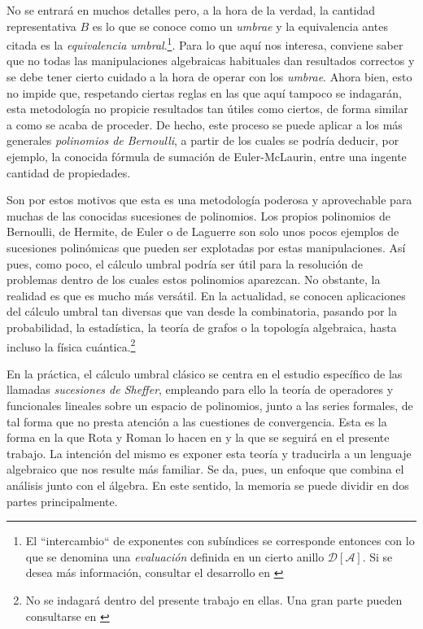 No se entrará en muchos detalles pero, a la hora de la verdad, la cantidad representativa $B$ es lo que se conoce como un \textit{umbrae} y la equivalencia antes citada es la \textit{equivalencia umbral}.\footnote{El ``intercambio`` de exponentes con subíndices se corresponde entonces con lo que se denomina una \textit{evaluación} definida en un cierto anillo $\mathcal{D}[\mathcal{A}]$. Si se desea más información, consultar el desarrollo en \cite{rota}}. Para lo que aquí nos interesa, conviene saber que no todas las manipulaciones algebraicas habituales dan resultados correctos y se debe tener cierto cuidado a la hora de operar con los \textit{umbrae}. Ahora bien, esto no impide que, respetando ciertas reglas en las que aquí tampoco se indagarán, esta metodología no propicie resultados tan útiles como ciertos, de forma similar a como se acaba de proceder. De hecho, este proceso se puede aplicar a los más generales \textit{polinomios de Bernoulli}, a partir de los cuales se podría deducir, por ejemplo, la conocida fórmula de sumación de Euler-McLaurin, entre una ingente cantidad de propiedades.

Son por estos motivos que esta es una metodología poderosa y aprovechable para muchas de las conocidas sucesiones de polinomios. Los propios polinomios de Bernoulli, de Hermite, de Euler o de Laguerre son solo unos pocos ejemplos de sucesiones polinómicas que pueden ser explotadas por estas manipulaciones. Así pues, como poco, el cálculo umbral podría ser útil para la resolución de problemas dentro de los cuales estos polinomios aparezcan. No obstante, la realidad es que es mucho más versátil. En la actualidad, se conocen aplicaciones del cálculo umbral tan diversas que van desde la combinatoria, pasando por la probabilidad, la estadística, la teoría de grafos o la topología algebraica, hasta incluso la física cuántica.\footnote{No se indagará dentro del presente trabajo en ellas. Una gran parte pueden consultarse en \cite{bucchianico}}

En la práctica, el cálculo umbral clásico se centra en el estudio específico de las llamadas \textit{sucesiones de Sheffer}, empleando para ello la teoría de operadores y funcionales lineales sobre un espacio de polinomios, junto a las series formales, de tal forma que no presta atención a las cuestiones de convergencia. Esta es la forma en la que Rota y Roman lo hacen en \cite{roman1} y la que se seguirá en el presente trabajo. La intención del mismo es exponer esta teoría y traducirla a un lenguaje algebraico que nos resulte más familiar. Se da, pues, un enfoque que combina el análisis junto con el álgebra. En este sentido, la memoria se puede dividir en dos partes principalmente.

